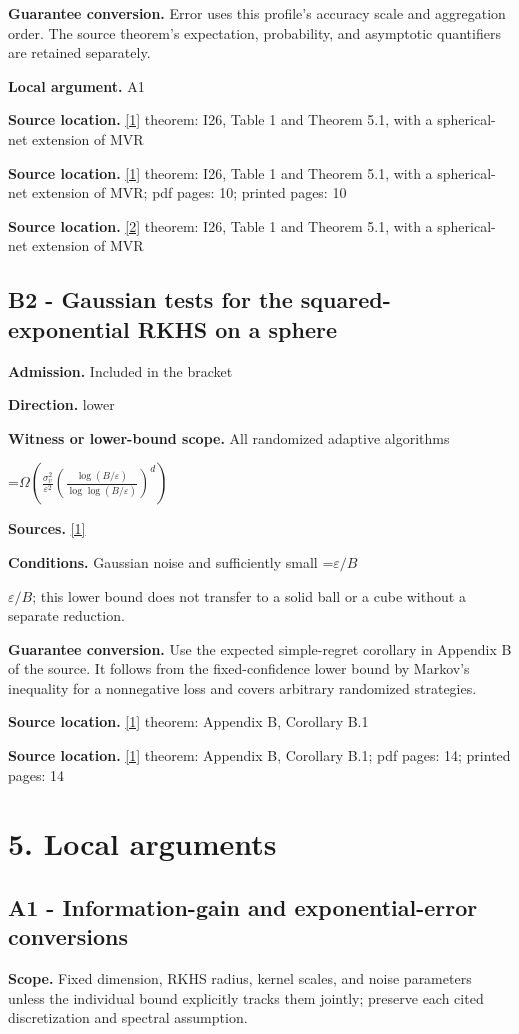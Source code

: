 \documentclass[10pt,a4paper]{article}
\newcommand{\AtlasMath}[1]{\par\begingroup\centering\setbox0=\hbox{$\displaystyle #1$}\ifdim\wd0>1.4\linewidth\typeout{ATLAS WIDE FORMULA: \the\wd0}\fi\ifdim\wd0>\linewidth\resizebox{\linewidth}{!}{\box0}\else\box0\fi\par\endgroup}
\newcommand{\AtlasInlineMath}[1]{\begingroup\setbox0=\hbox{$#1$}\ifdim\wd0>.4\linewidth\endgroup\AtlasMath{#1}\else\endgroup$#1$\fi}
\begin{document}
\textbf{Guarantee conversion.} Error uses this profile's accuracy scale and aggregation order. The source theorem's expectation, probability, and asymptotic quantifiers are retained separately.

\textbf{Local argument.} A1

\textbf{Source location.} \href{https://arxiv.org/html/2602.17940v1}{[1]} theorem: I26, Table 1 and Theorem 5.1, with a spherical-net extension of MVR

\textbf{Source location.} \href{https://arxiv.org/html/2602.17940v1}{[1]} theorem: I26, Table 1 and Theorem 5.1, with a spherical-net extension of MVR; pdf pages: 10; printed pages: 10

\textbf{Source location.} \href{https://proceedings.neurips.cc/paper/2021/file/b1300291698eadedb559786c809cc592-Paper.pdf}{[2]} theorem: I26, Table 1 and Theorem 5.1, with a spherical-net extension of MVR

\subsection{B2 - Gaussian tests for the squared-exponential RKHS on a sphere}
\textbf{Admission.} Included in the bracket

\textbf{Direction.} lower

\textbf{Witness or lower-bound scope.} All randomized adaptive algorithms

\AtlasMath{\Omega\!\left(\frac{\sigma_v^2}{\varepsilon^2}\left(\frac{\log(B/\varepsilon)}{\log\log(B/\varepsilon)}\right)^d\right)}
\textbf{Sources.} \href{https://arxiv.org/html/2602.17940v1}{[1]}

\textbf{Conditions.} Gaussian noise and sufficiently small \AtlasInlineMath{\varepsilon/B}; this lower bound does not transfer to a solid ball or a cube without a separate reduction.

\textbf{Guarantee conversion.} Use the expected simple-regret corollary in Appendix B of the source. It follows from the fixed-confidence lower bound by Markov's inequality for a nonnegative loss and covers arbitrary randomized strategies.

\textbf{Source location.} \href{https://arxiv.org/html/2602.17940v1}{[1]} theorem: Appendix B, Corollary B.1

\textbf{Source location.} \href{https://arxiv.org/html/2602.17940v1}{[1]} theorem: Appendix B, Corollary B.1; pdf pages: 14; printed pages: 14

\section{5. Local arguments}
\subsection{A1 - Information-gain and exponential-error conversions}
\textbf{Scope.} Fixed dimension, RKHS radius, kernel scales, and noise parameters unless the individual bound explicitly tracks them jointly; preserve each cited discretization and spectral assumption.
\end{document}
